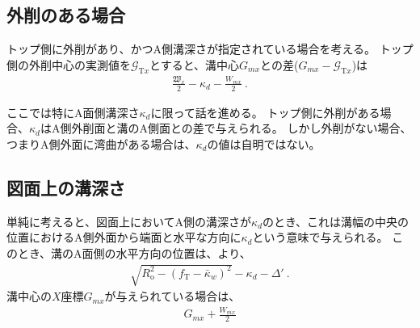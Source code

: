 \subsection{外削のある場合}
トップ側に外削があり、かつA側溝深さが指定されている場合を考える。
トップ側の外削中心の実測値を$\mathcal G_{\mathrm Tx}$とすると、溝中心$G_{mx}$との差($G_{mx}-\mathcal G_{\mathrm Tx}$)は
\begin{align}
  \label{eq:mizocenterAG}
  \frac{\mathfrak W_x}2-\kappa_d-\frac{W_{mx}}2\ .
\end{align}



\clearpage
ここでは特にA面側溝深さ$\kappa_d$に限って話を進める。
トップ側に外削がある場合、$\kappa_d$はA側外削面と溝のA側面との差で与えられる。
しかし外削がない場合、つまりA側外面に湾曲がある場合は、$\kappa_d$の値は自明ではない。


\subsection{図面上の溝深さ}
単純に考えると、図面上においてA側の溝深さが$\kappa_d$のとき、これは溝幅の中央の位置におけるA側外面から端面と水平な方向に$\kappa_d$という意味で与えられる。
このとき、溝のA面側の水平方向の位置は、より、
\begin{align*}
  \sqrt{R_\mathrm o^2-(f_\mathrm T-\bar\kappa_w)^2}-\kappa_d-\varDelta'\ .
\end{align*}
溝中心の$X$座標$G_{mx}$が与えられている場合は、
\begin{align*}
  G_{mx}+\frac{W_{mx}}2
\end{align*}



